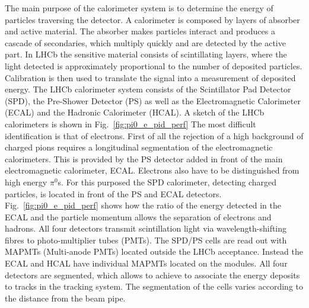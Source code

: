 The main purpose of the calorimeter system is to determine the energy of particles traversing the detector. 
A calorimeter is composed by layers of absorber and active material. The absorber makes particles
interact and produces a cascade of secondaries, which multiply quickly and are detected by the active part.
In LHCb the sensitive material consists of scintillating layers, where the light detected is approximately proportional 
to the number of deposited particles. Calibration is then used to translate the signal into a measurement 
of deposited energy. 
The LHCb calorimeter system consists of the Scintillator Pad Detector (SPD), the Pre-Shower Detector (PS)
as well as the Electromagnetic Calorimeter (ECAL) and the Hadronic Calorimeter (HCAL).
A sketch of the LHCb calorimeters is shown in Fig.~\ref{fig:pi0_e_pid_perf}
The most difficult identification is that of electrons. First of all the rejection of a high background
of charged pions requires a longitudinal segmentation of the electromagnetic calorimeters. This is provided by
the PS detector added in front of the main electromagnetic calorimeter, ECAL. Electrons also have to be 
distinguished from high energy $\pi^0$s. For this purposed the SPD calorimeter, detecting charged particles,
is located in front of the PS and ECAL detectors. Fig.~\ref{fig:pi0_e_pid_perf} shows how the ratio of the
energy detected in the ECAL and the particle momentum allows the separation of electrons and hadrons.
All four detectors transmit scintillation light via
wavelength-shifting fibres to photo-multiplier tubes (PMTs). The SPD/PS cells are read out with MAPMTs 
(Multi-anode PMTs) located outside the LHCb acceptance. Instead the ECAL and HCAL have individual MAPMTs
located on the modules. All four detectors are segmented, which allows to achieve to associate the energy
deposits to tracks in the tracking system. The segmentation of the cells varies according 
to the distance from the beam pipe.

